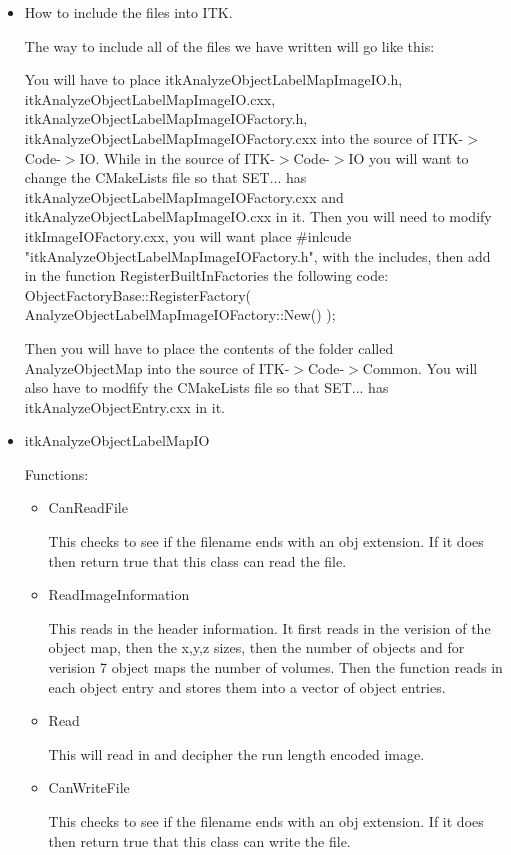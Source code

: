 \documentclass{InsightArticle}
\begin{document}
\begin{itemize}
\item How to include the files into ITK.

The way to include all of the files we have written will go like this:

You will have to place itkAnalyzeObjectLabelMapImageIO.h, itkAnalyzeObjectLabelMapImageIO.cxx, itkAnalyzeObjectLabelMapImageIOFactory.h, itkAnalyzeObjectLabelMapImageIOFactory.cxx into the source of ITK-$>$Code-$>$IO.  While in the source of ITK-$>$Code-$>$IO you will want to change the CMakeLists file so that SET{...} has itkAnalyzeObjectLabelMapImageIOFactory.cxx and itkAnalyzeObjectLabelMapImageIO.cxx in it.  Then you will need to modify itkImageIOFactory.cxx, you will want place \#inlcude "itkAnalyzeObjectLabelMapImageIOFactory.h", with the includes, then add in the function RegisterBuiltInFactories the following code: ObjectFactoryBase::RegisterFactory( AnalyzeObjectLabelMapImageIOFactory::New() );

Then you will have to place the contents of the folder called AnalyzeObjectMap into the source of ITK-$>$Code-$>$Common.  You will also have to modfify the CMakeLists file so that SET{...} has itkAnalyzeObjectEntry.cxx in it.

\item itkAnalyzeObjectLabelMapIO

Functions:
\begin{itemize}
\item CanReadFile

This checks to see if the filename ends with an obj extension.  If it does then return true that this class can read the file.

\item ReadImageInformation

This reads in the header information.  It first reads in the verision of the object map, then the x,y,z sizes, then the number of objects and for verision 7 object maps the number of volumes.  Then the function reads in each object entry and stores them into a vector of object entries.

\item Read

This will read in and decipher the run length encoded image.

\item CanWriteFile

This checks to see if the filename ends with an obj extension.  If it does then return true that this class can write the file.


\end{itemize}
\end{itemize}
\end{document}
